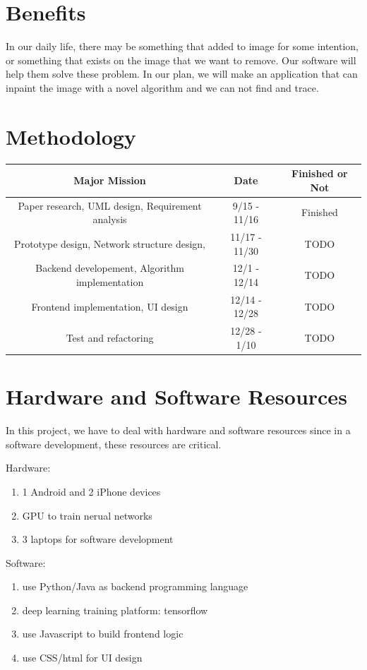 \documentclass[12pt]{article}
\begin{document}
\section{Benefits}
\qquad In our daily life, there may be something that added to image for some intention, or something that exists on the image that we want to remove. Our software will help them solve these problem. In our plan, we will make an application that can inpaint the image with a novel algorithm and we can not find and trace. 
\section{Methodology}
\begin{table}[H]
	\centering
	\begin{tabular}{|c|c|c|}
		\hline
		Major Mission & Date & Finished or Not \\
		\hline
		Paper research, UML design, Requirement analysis
		& 9/15 - 11/16& Finished \\
		\hline
		 Prototype design, Network structure design, 
		 & 11/17 - 11/30 & TODO \\
		\hline
		 Backend developement, Algorithm implementation & 12/1 - 12/14 & TODO\\
		\hline
		 Frontend implementation, UI design & 12/14 - 12/28 & TODO\\
		\hline
		 Test and refactoring & 12/28 - 1/10 & TODO\\
		\hline 
		
	\end{tabular}
\end{table}


\section{Hardware and Software Resources}
In this project, we have to deal with hardware and software resources since 
in a software development, these resources are critical.

Hardware:
\begin{enumerate}
\item 1 Android and 2 iPhone devices
\item GPU to train nerual networks
\item 3 laptops for software development
\end{enumerate}

Software:
\begin{enumerate}
\item use Python/Java as backend programming language
\item deep learning training platform: tensorflow
\item use Javascript to build frontend logic
\item use CSS/html for UI design
\end{enumerate}
\end{document}
